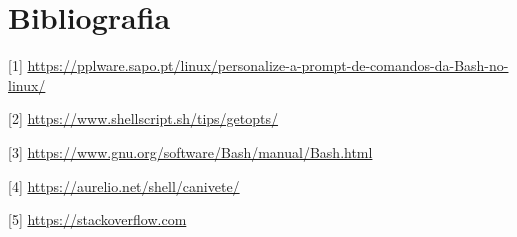 \documentclass[10pt,portuguese]{article}
\begin{document}
\clearpage

\section{Bibliografia}





\vspace{5mm} %

[1] \url{https://pplware.sapo.pt/linux/personalize-a-prompt-de-comandos-da-Bash-no-linux/}

[2] \url{https://www.shellscript.sh/tips/getopts/}

[3] \url{https://www.gnu.org/software/Bash/manual/Bash.html}

[4] \url{https://aurelio.net/shell/canivete/}

[5] \url{https://stackoverflow.com}
\end{document}
